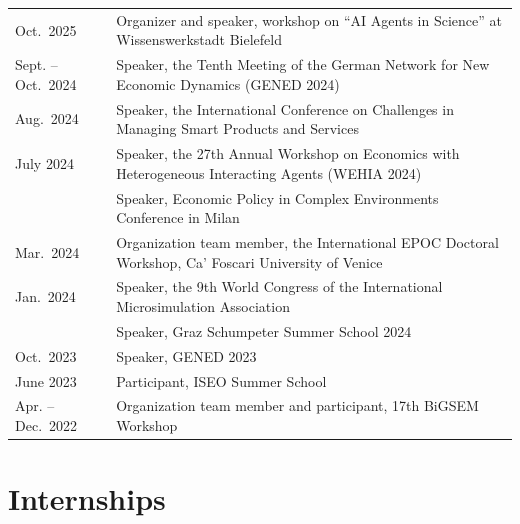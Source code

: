 \documentclass[a4paper,12pt]{article}
\begin{document}




\begin{tabularx}{\linewidth}{@{}l X@{}}

Oct.\ 2025 & Organizer and speaker, workshop on “AI Agents in Science” at Wissenswerkstadt Bielefeld \\

Sept. -- Oct.\ 2024 & Speaker, the Tenth Meeting of the German Network for New Economic Dynamics (GENED 2024) \\

Aug.\ 2024 & Speaker, the International Conference on Challenges in Managing Smart Products and Services \\

July 2024 & Speaker, the 27th Annual Workshop on Economics with Heterogeneous Interacting Agents (WEHIA 2024) \\
& Speaker, Economic Policy in Complex Environments Conference in Milan \\

Mar.\ 2024 & Organization team member, the International EPOC Doctoral Workshop, Ca’ Foscari University of Venice \\

Jan.\ 2024 & Speaker, the 9th World Congress of the International Microsimulation Association \\

 & Speaker, Graz Schumpeter Summer School 2024 \\

Oct.\ 2023 & Speaker, GENED 2023 \\

June 2023 & Participant, ISEO Summer School \\

Apr. -- Dec.\ 2022 & Organization team member and participant, 17th BiGSEM Workshop \\

\end{tabularx}


\section{Internships}
\end{document}
